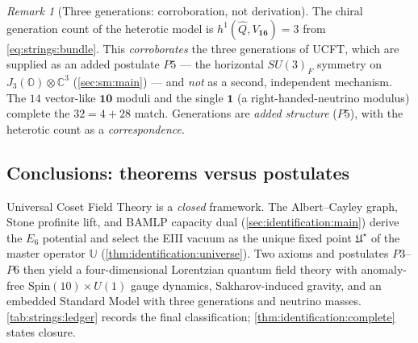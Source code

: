 \documentclass[11pt]{article}
\theoremstyle{plain}
\theoremstyle{definition}
\theoremstyle{remark}
\newtheorem{remark}[theorem]{Remark}
\begin{document}
\begin{remark}[Three generations: corroboration, not derivation]
\label{rem:strings:gen}
The chiral generation count of the heterotic model is
$h^{1}(\widehat{Q},V_{\mathbf{16}})=3$ from \eqref{eq:strings:bundle}.
This \emph{corroborates} the three generations of UCFT, which are
supplied as an added postulate $P5$ --- the horizontal $SU(3)_{F}$
symmetry on $J_{3}(\mathbb{O})\otimes\mathbb{C}^{3}$
(\autoref{sec:sm:main}) --- and \emph{not} as a second, independent
mechanism. The $14$ vector-like $\mathbf{10}$ moduli and the single
$\mathbf{1}$ (a right-handed-neutrino modulus) complete the
$32=4+28$ match. Generations are \emph{added structure} ($P5$), with the
heterotic count as a \emph{correspondence}.
\end{remark}

\subsection{Conclusions: theorems versus postulates}
\label{sec:strings:conclusions}

Universal Coset Field Theory is a \emph{closed} framework. The Albert--Cayley
graph, Stone profinite lift, and BAMLP capacity dual
(\autoref{sec:identification:main}) derive the $E_6$ potential and select the
EIII vacuum as the unique fixed point $\mathfrak{U}^\star$ of the master
operator $\mathbb{U}$ (\autoref{thm:identification:universe}). Two axioms and
postulates $P3$--$P6$ then yield a four-dimensional Lorentzian quantum field
theory with anomaly-free $\mathrm{Spin}(10)\times U(1)$ gauge dynamics,
Sakharov-induced gravity, and an embedded Standard Model with three generations
and neutrino masses. \autoref{tab:strings:ledger} records the final
classification; \autoref{thm:identification:complete} states closure.
\end{document}
